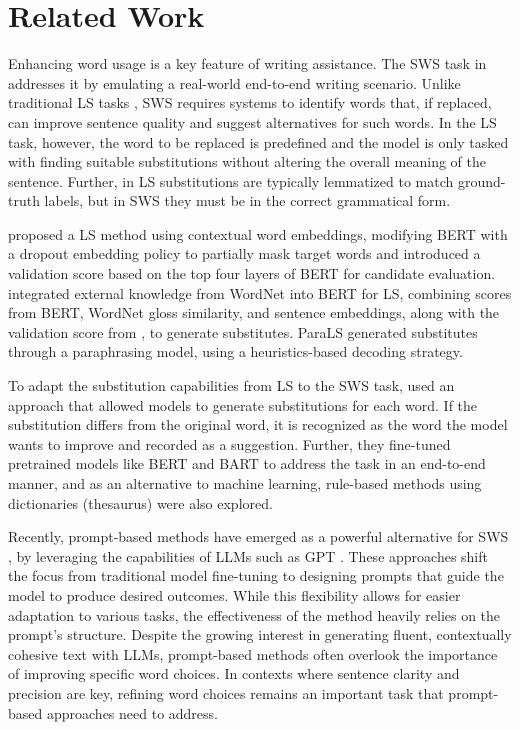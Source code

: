 \section{Related Work}
%
Enhancing word usage is a key feature of writing assistance.
The SWS task in \citet{wang2023smart} addresses it by emulating a real-world end-to-end writing scenario.
Unlike traditional LS tasks \citep{mccarthy2007semeval, kremer2014substitutes}, SWS requires systems to identify words that, if replaced, can improve sentence quality and suggest alternatives for such words.
In the LS task, however, the word to be replaced is predefined and the model is only tasked with finding suitable substitutions without altering the overall meaning of the sentence.
Further, in LS substitutions are typically lemmatized to match ground-truth labels, but in SWS they must be in the correct grammatical form.

\citet{zhou2019BERT} proposed a LS method using contextual word embeddings, modifying BERT with a dropout embedding policy to partially mask target words and introduced a validation score based on the top four layers of BERT for candidate evaluation.
\citet{michalopoulos2021lexsubcon} integrated external knowledge from WordNet into BERT for LS, combining scores from BERT, WordNet gloss similarity, and sentence embeddings, along with the validation score from \citet{zhou2019BERT}, to generate substitutes.
ParaLS \citep{qiang2023parals} generated substitutes through a paraphrasing model, using a heuristics-based decoding strategy.

To adapt the substitution capabilities from LS to the SWS task, \citet{wang2023smart} used an approach that allowed models to generate substitutions for each word.
If the substitution differs from the original word, it is recognized as the word the model wants to improve and recorded as a suggestion.
Further, they fine-tuned pretrained models like BERT \citep{devlin2018BERT} and BART \citep{lewis2019bart} to address the task in an end-to-end manner, and as an alternative to machine learning, rule-based methods using dictionaries (thesaurus) were also explored.

Recently, prompt-based methods have emerged as a powerful alternative for SWS \citep{wang2023smart}, by leveraging the capabilities of LLMs such as GPT \citep{ouyang2022training}.
These approaches shift the focus from traditional model fine-tuning to designing prompts that guide the model to produce desired outcomes.
While this flexibility allows for easier adaptation to various tasks, the effectiveness of the method heavily relies on the prompt's structure.
Despite the growing interest in generating fluent, contextually cohesive text with LLMs, prompt-based methods often overlook the importance of improving specific word choices.
In contexts where sentence clarity and precision are key, refining word choices remains an important task that prompt-based approaches need to address.

